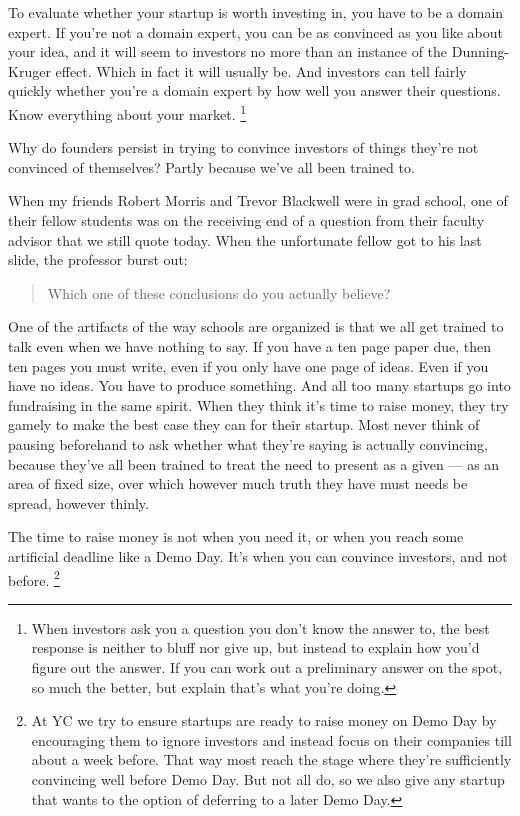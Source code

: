 \documentclass[12pt]{book}
\begin{document}
To evaluate whether your startup is worth investing in, you have to be a
domain expert. If you're not a domain expert, you can be as convinced as
you like about your idea, and it will seem to investors no more than an
instance of the Dunning-Kruger effect. Which in fact it will usually be.
And investors can tell fairly quickly whether you're a domain expert by
how well you answer their questions. Know everything about your market.
\footnote{When investors ask you a question you don't know the answer to,
the best response is neither to bluff nor give up, but instead to
explain how you'd figure out the answer. If you can work out a
preliminary answer on the spot, so much the better, but explain that's
what you're doing.}

Why do founders persist in trying to convince investors of things
they're not convinced of themselves? Partly because we've all been
trained to.

When my friends Robert Morris and Trevor Blackwell were in grad school,
one of their fellow students was on the receiving end of a question from
their faculty advisor that we still quote today. When the unfortunate
fellow got to his last slide, the professor burst out:

\begin{quote}
Which one of these conclusions do you actually believe?
\end{quote}

One of the artifacts of the way schools are organized is that we all get
trained to talk even when we have nothing to say. If you have a ten page
paper due, then ten pages you must write, even if you only have one page
of ideas. Even if you have no ideas. You have to produce something. And
all too many startups go into fundraising in the same spirit. When they
think it's time to raise money, they try gamely to make the best case
they can for their startup. Most never think of pausing beforehand to
ask whether what they're saying is actually convincing, because they've
all been trained to treat the need to present as a given --- as an area
of fixed size, over which however much truth they have must needs be
spread, however thinly.

The time to raise money is not when you need it, or when you reach some
artificial deadline like a Demo Day. It's when you can convince
investors, and not before. \footnote{At YC we try to ensure startups are ready to raise money on Demo
Day by encouraging them to ignore investors and instead focus on their
companies till about a week before. That way most reach the stage where
they're sufficiently convincing well before Demo Day. But not all do, so
we also give any startup that wants to the option of deferring to a
later Demo Day.}
\end{document}
